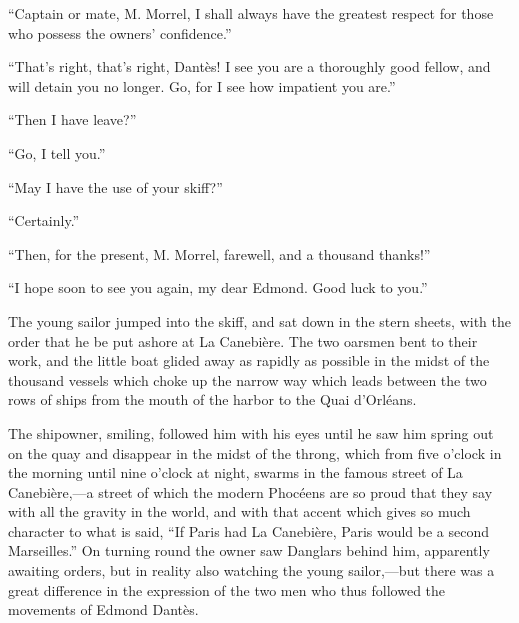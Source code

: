 “Captain or mate, M. Morrel, I shall always have the greatest respect
for those who possess the owners’ confidence.”

“That’s right, that’s right, Dantès! I see you are a thoroughly good
fellow, and will detain you no longer. Go, for I see how impatient you
are.”

“Then I have leave?”

“Go, I tell you.”

“May I have the use of your skiff?”

“Certainly.”

“Then, for the present, M. Morrel, farewell, and a thousand thanks!”

“I hope soon to see you again, my dear Edmond. Good luck to you.”

The young sailor jumped into the skiff, and sat down in the stern
sheets, with the order that he be put ashore at La Canebière. The two
oarsmen bent to their work, and the little boat glided away as rapidly
as possible in the midst of the thousand vessels which choke up the
narrow way which leads between the two rows of ships from the mouth of
the harbor to the Quai d’Orléans.

The shipowner, smiling, followed him with his eyes until he saw him
spring out on the quay and disappear in the midst of the throng, which
from five o’clock in the morning until nine o’clock at night, swarms in
the famous street of La Canebière,—a street of which the modern
Phocéens are so proud that they say with all the gravity in the world,
and with that accent which gives so much character to what is said, “If
Paris had La Canebière, Paris would be a second Marseilles.” On turning
round the owner saw Danglars behind him, apparently awaiting orders,
but in reality also watching the young sailor,—but there was a great
difference in the expression of the two men who thus followed the
movements of Edmond Dantès.
